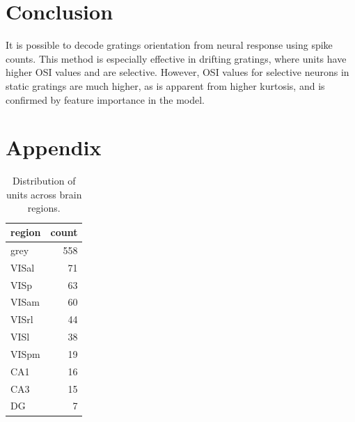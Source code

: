 \documentclass[10pt,twocolumn]{article}
\begin{document}
\section{Conclusion}

It is possible to decode gratings orientation from neural response using spike counts. This method is especially effective in drifting gratings, where units have higher OSI values and are selective. However, OSI values for selective neurons in static gratings are much higher, as is apparent from higher kurtosis, and is confirmed by feature importance in the model.

\newpage




\appendix

\section{Appendix}

\begin{table}[H]
  \centering
  \begin{tabular}{lr}
    \toprule
    region & count \\
    \midrule
    grey   & 558 \\
    VISal  &  71 \\
    VISp   &  63 \\
    VISam  &  60 \\
    VISrl  &  44 \\
    VISl   &  38 \\
    VISpm  &  19 \\
    CA1    &  16 \\
    CA3    &  15 \\
    DG     &   7 \\
    \bottomrule
  \end{tabular}
  \caption{Distribution of units across brain regions.}
  \label{tab:regions}
\end{table}
\end{document}
